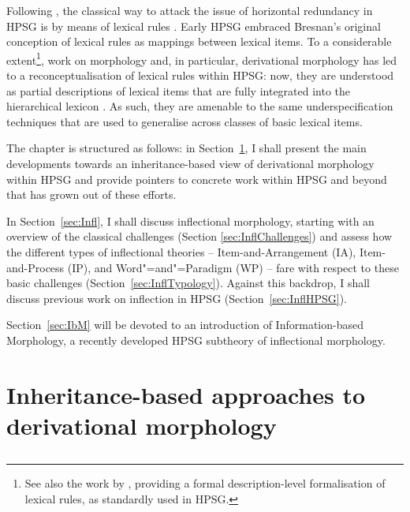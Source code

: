 \documentclass[output=paper
 	        ,biblatex
                ,babelshorthands
                ,newtxmath
                ,draftmode
                ,colorlinks, citecolor=brown
]{langscibook}
\begin{document}
Following \citet{Bresnan82}, the classical way to attack the issue of
horizontal redundancy in HPSG is by means of lexical rules
\citep{Flickinger87}. Early HPSG embraced Bresnan's original
conception of lexical rules as mappings between lexical items. To a
considerable extent\footnote{See also the work by
  \citet{meurers:towards,Meurers02}, providing a formal
  description-level formalisation of lexical rules, as standardly used
  in HPSG.}, work on morphology and, in particular, derivational
morphology has led to a reconceptualisation of lexical rules within
HPSG: now, they are understood as partial descriptions of lexical
items that are fully integrated into the hierarchical lexicon
\citep{meurers:towards,Copestake:01,Koenig99}. As such, they are
amenable to the same underspecification techniques that are used to
generalise across classes of basic lexical items.


The chapter is structured as follows: in Section~\ref{sec:Deriv}, I
shall present the main developments towards an inheritance-based view
of derivational morphology within HPSG and provide pointers to
concrete work within HPSG and beyond that has grown out of
these efforts. 

In Section~\ref{sec:Infl}, I shall discuss inflectional morphology,
starting with an overview of the classical challenges (Section
\ref{sec:InflChallenges}) and assess how the different types of
inflectional theories -- Item-and-Arrangement (IA), Item-and-Process
(IP), and Word"=and"=Paradigm (WP) -- fare with respect to these
basic challenges (Section~\ref{sec:InflTypology}). Against this
backdrop, I shall discuss previous work on inflection in HPSG
(Section~\ref{sec:InflHPSG}).

Section~\ref{sec:IbM} will be devoted to an introduction of
Information-based Morphology, a recently developed HPSG subtheory of
inflectional morphology.



\section{Inheritance-based approaches to derivational morphology}
\label{sec:Deriv}\label{sec:derivational-morphology}

\subsection{\citet{Krieger:Nerbonne:93}}
\end{document}
